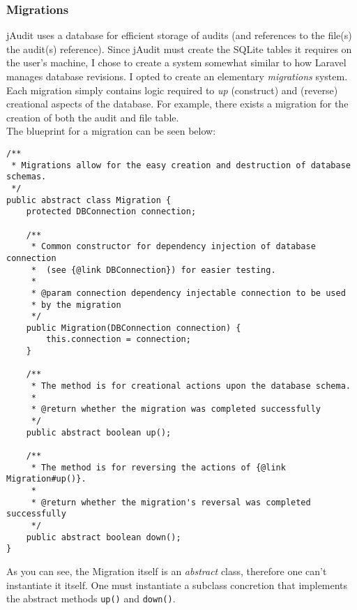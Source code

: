 \documentclass[9pt]{article}
\renewenvironment{framed}[1][\hsize]
   {\MakeFramed{\hsize#1\advance\hsize-\width \FrameRestore}}%
   {\endMakeFramed}
\begin{document}
		\subsubsection{Migrations}
			jAudit uses a database for efficient storage of audits (and
			references to the file(s) the audit(s) reference). Since jAudit must
			create the SQLite tables it requires on the user's machine, I chose
			to create a system somewhat similar to how Laravel manages database
			revisions. I opted to create an elementary \textit{migrations}
			system. Each migration simply contains logic required to \textit{up}
			(construct) and  (reverse) creational aspects of the
			database. For example, there exists a migration for the creation of
			both the audit and file table.\\

			The blueprint for a migration can be seen below:\\

			\begin{framed}[1.2\textwidth]	
				\begin{verbatim}
/**
 * Migrations allow for the easy creation and destruction of database schemas.
 */
public abstract class Migration {
    protected DBConnection connection;

    /**
     * Common constructor for dependency injection of database connection
     *  (see {@link DBConnection}) for easier testing.
     *
     * @param connection dependency injectable connection to be used
     * by the migration
     */
    public Migration(DBConnection connection) {
        this.connection = connection;
    }

    /**
     * The method is for creational actions upon the database schema.
     *
     * @return whether the migration was completed successfully
     */
    public abstract boolean up();

    /**
     * The method is for reversing the actions of {@link Migration#up()}.
     *
     * @return whether the migration's reversal was completed successfully
     */
    public abstract boolean down();
}
				\end{verbatim}
			\end{framed}

			As you can see, the Migration itself is an \textit{abstract} class,
			therefore one can't instantiate it itself. One must instantiate a
			subclass concretion that implements the abstract methods
			\texttt{up()} and \texttt{down()}.\\
\end{document}
